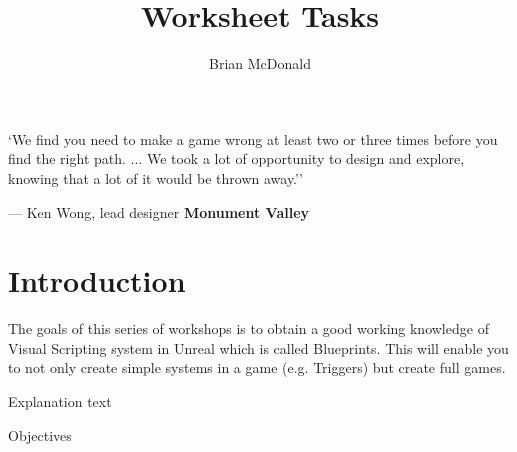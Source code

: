 \documentclass{../../fal_assignment}
\title{Worksheet Tasks}
\author{Brian McDonald} %
\begin{document}
\maketitle 


\begin{marginquote}
`We find you need to make a game wrong at least two or three times before you find the right path. ...
We took a lot of opportunity to design and explore, knowing that a lot of it would be thrown away.''
\par --- Ken Wong, lead designer \textbf{Monument Valley}
\end{marginquote}

\section*{Introduction}
The goals of this series of workshops is to obtain a good working knowledge of Visual Scripting system in Unreal which is called Blueprints. This will enable you to not only create simple systems in a game (e.g. Triggers) but create full games.

Explanation text

Objectives

\end{document}
